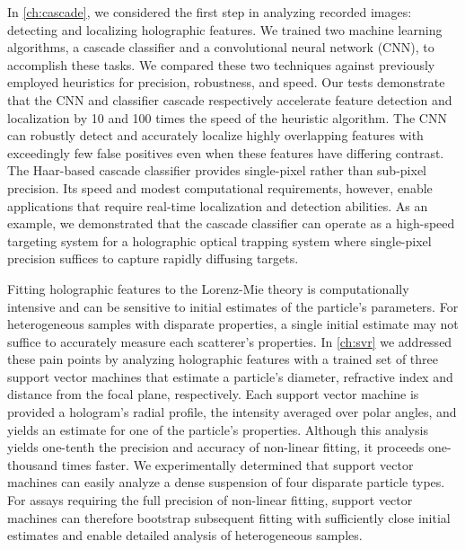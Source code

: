 In \autoref{ch:cascade}, we considered the first step in analyzing recorded
images: detecting and localizing holographic features. We trained two machine
learning algorithms, a cascade classifier and a convolutional neural network (CNN),
to accomplish these tasks. We compared these two techniques against previously
employed heuristics for precision, robustness, and speed. Our tests demonstrate that
the CNN and classifier cascade respectively accelerate feature detection and localization
by \num{10} and \num{100} times the speed of the heuristic algorithm.
The CNN can robustly detect and accurately
localize highly overlapping features with exceedingly few false positives even
when these features have differing contrast.
The Haar-based cascade classifier provides single-pixel rather than
sub-pixel precision. Its speed and modest computational requirements, however, enable
applications that require
real-time localization and detection abilities. As an example, we demonstrated that the cascade
classifier can operate as a high-speed targeting system for a holographic
optical trapping system where single-pixel precision suffices to capture
rapidly diffusing targets.

Fitting holographic features to the Lorenz-Mie theory is computationally intensive
and can be sensitive to initial estimates of the particle's parameters. For heterogeneous
samples with disparate properties, a single initial estimate may not suffice
to accurately measure each scatterer's properties. In \autoref{ch:svr} we
addressed these pain points by analyzing holographic features with a trained set
of three support vector machines that estimate a particle's diameter, refractive index
and distance from the focal plane, respectively. Each support vector
machine is provided a hologram's radial profile, the intensity averaged over
polar angles, and yields an estimate for one of the particle's properties. Although
this analysis yields one-tenth the precision and accuracy of non-linear fitting,
it proceeds one-thousand times faster. We experimentally determined that
support vector machines can easily analyze a dense suspension of four
disparate particle types. For assays requiring the full precision of non-linear
fitting, support vector machines can therefore bootstrap subsequent fitting with sufficiently
close initial estimates and enable detailed analysis of heterogeneous samples.

